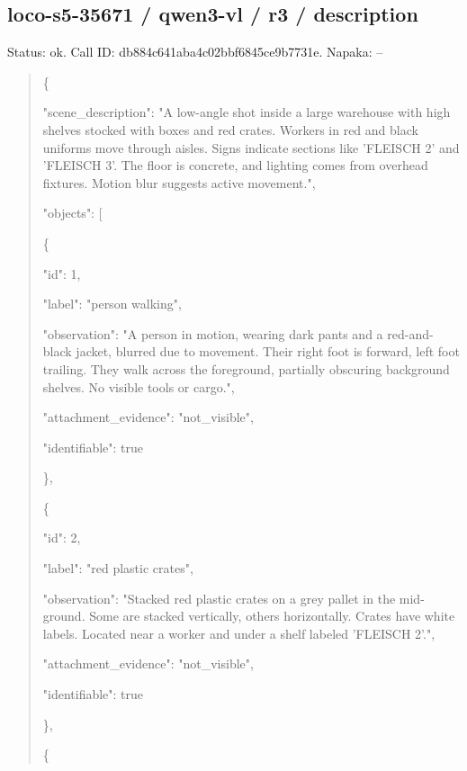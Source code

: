 \documentclass[10pt,a4paper]{article}
\begin{document}
\subsection*{loco-s5-35671 / qwen3-vl / r3 / description}
Status: ok. Call ID: db884c641aba4c02bbf6845ce9b7731e. Napaka: --
\begin{quote}\footnotesize
\{\par
  "scene\_description":\allowbreak{} "A low-angle shot inside a large warehouse with high shelves stocked with boxes and red crates. Workers in red and black uniforms move through aisles. Signs indicate sections like 'FLEISCH 2' and 'FLEISCH 3'. The floor is concrete,\allowbreak{} and lighting comes from overhead fixtures. Motion blur suggests active movement.",\allowbreak{}\par
  "objects":\allowbreak{} [\par
    \{\par
      "id":\allowbreak{} 1,\allowbreak{}\par
      "label":\allowbreak{} "person walking",\allowbreak{}\par
      "observation":\allowbreak{} "A person in motion,\allowbreak{} wearing dark pants and a red-and-black jacket,\allowbreak{} blurred due to movement. Their right foot is forward,\allowbreak{} left foot trailing. They walk across the foreground,\allowbreak{} partially obscuring background shelves. No visible tools or cargo.",\allowbreak{}\par
      "attachment\_evidence":\allowbreak{} "not\_visible",\allowbreak{}\par
      "identifiable":\allowbreak{} true\par
    \},\allowbreak{}\par
    \{\par
      "id":\allowbreak{} 2,\allowbreak{}\par
      "label":\allowbreak{} "red plastic crates",\allowbreak{}\par
      "observation":\allowbreak{} "Stacked red plastic crates on a grey pallet in the mid-ground. Some are stacked vertically,\allowbreak{} others horizontally. Crates have white labels. Located near a worker and under a shelf labeled 'FLEISCH 2'.",\allowbreak{}\par
      "attachment\_evidence":\allowbreak{} "not\_visible",\allowbreak{}\par
      "identifiable":\allowbreak{} true\par
    \},\allowbreak{}\par
    \{\par

\end{quote}
\end{document}
